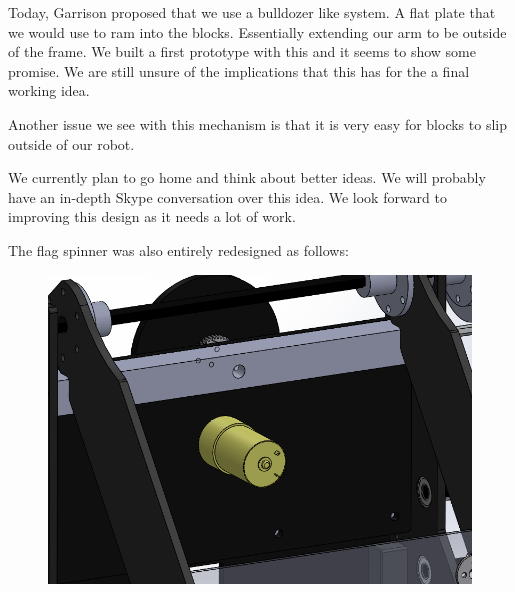 Today, Garrison proposed that we use a bulldozer like system. A flat plate that we would use to ram into the blocks. Essentially extending our arm to be outside of the frame. We built a first prototype with this and it seems to show some promise. We are still unsure of the implications that this has for the a final working idea. 

Another issue we see with this mechanism is that it is very easy for blocks to slip outside of our robot. 

We currently plan to go home and think about better ideas. We will probably have an in-depth Skype conversation over this idea. We look forward to improving this design as it needs a lot of work. 

The flag spinner was also entirely redesigned as follows:

\begin{figure}[H]
\begin{center}
\includegraphics[scale=0.4]{images/FlagSpinnerV2Back.png}

\end{center}
\end{figure}
